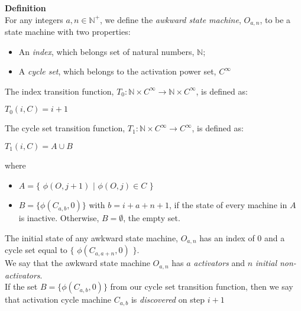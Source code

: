 \documentclass[a4paper,12pt]{article}
\begin{document}
\label{definition:awkward_state_machine}
\hypertarget{definition:awkward_state_machine}{}
\begin{tcolorbox}
\textbf{Definition}\\
For any integers $a, n \in \mathbb{N^+}$, we define the \textit{awkward state machine}, $O_{a,n}$, to be a state machine with two properties:

\begin{itemize}
\item An \textit{index}, which belongs set of natural numbers, $\mathbb{N}$;

\item A \textit{cycle set}, which belongs to the activation power set, $ C^{\infty}$

\end{itemize}

The index transition function, $T_0: \mathbb{N} \times C^{\infty} \rightarrow \mathbb{N} \times C^{\infty}$, is defined as:
\begin{center}
$T_0(i, C) = i + 1$
\end{center}

The cycle set transition function, $T_1: \mathbb{N} \times C^{\infty} \rightarrow C^{\infty}$, is defined as:
\begin{center}
$T_1(i, C) = A \cup B$
\end{center}
where
\begin{itemize}
\item $A = \{$ $\phi(O, j + 1)$ $|$ $\phi(O, j) \in C$ $\}$

\item $B = \{ \phi(C_{a, b}, 0) \}$ with $b = i + a + n + 1$, if the state of every machine in $A$ is inactive. Otherwise, $B = \emptyset$, the empty set.
\end{itemize}

The initial state of any awkward state machine, $O_{a,n}$ has an index of $0$ and a cycle set equal to $\{$ $\phi(C_{a, a + n}, 0)$ $\}$.\\

We say that the awkward state machine $O_{a,n}$ has $a$ \textit{activators} and $n$ \textit{initial non-activators}.\\

If the set $B = \{ \phi(C_{a, b}, 0) \}$ from our cycle set transition function, then we say that activation cycle machine $C_{a, b}$ is \textit{discovered} on step $i + 1$
\end{tcolorbox}
\end{document}
